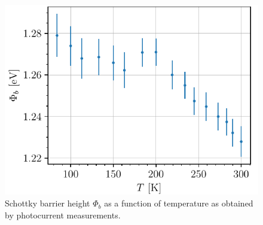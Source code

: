 \begin{figure}[htbp]
    \centering
    \includegraphics[scale=1]{figures/photoemission_phi.pdf}
    \caption{Schottky barrier height $\Phi_b$ as a function of temperature as obtained by photocurrent measurements.}
    \label{fig:photoemission_phi}
\end{figure}


